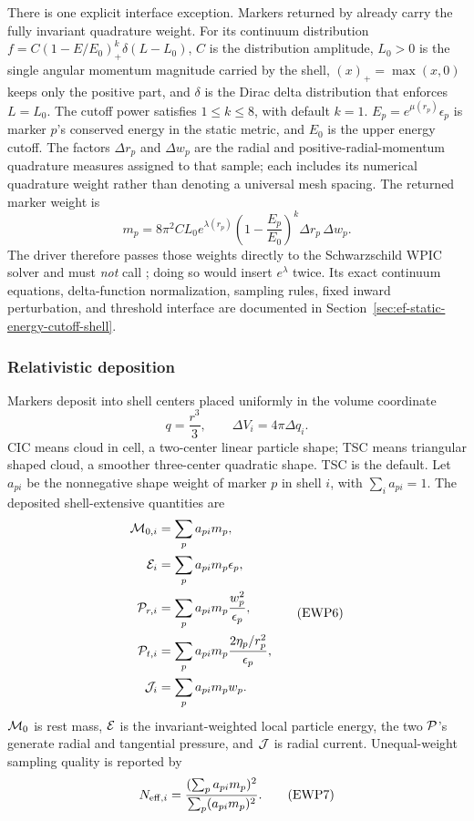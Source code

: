 There is one explicit interface exception.  Markers returned by
 already carry the
fully invariant quadrature weight.  For its continuum distribution
\(f=C(1-E/E_0)_+^k\delta(L-L_0)\), \(C\) is the distribution amplitude,
\(L_0>0\) is the single angular momentum magnitude carried by the shell,
\((x)_+=\max(x,0)\) keeps only the positive part, and \(\delta\) is the Dirac
delta distribution that enforces \(L=L_0\).
The cutoff power satisfies \(1\le k\le8\), with default \(k=1\).
\(E_p=e^{\mu(r_p)}\epsilon_p\) is marker \(p\)'s conserved energy in the
static metric, and \(E_0\) is the upper energy cutoff.  The factors
\(\Delta r_p\) and \(\Delta w_p\) are the radial and positive-radial-momentum
quadrature measures assigned to that sample; each includes its numerical
quadrature weight rather than denoting a universal mesh spacing.  The returned
marker weight is
\[
 m_p=8\pi^2 CL_0 e^{\lambda(r_p)}
      \left(1-\frac{E_p}{E_0}\right)^k
      \Delta r_p\,\Delta w_p .
\]
The  driver therefore passes those weights directly
to the Schwarzschild WPIC solver and must \emph{not} call
;
doing so would insert \(e^\lambda\) twice.  Its exact continuum equations,
delta-function normalization, sampling rules, fixed inward perturbation, and
threshold interface are documented in
Section~\ref{sec:ef-static-energy-cutoff-shell}.

\subsubsection{Relativistic deposition}

Markers deposit into shell centers placed uniformly in the volume coordinate
\[
 q=\frac{r^3}{3},\qquad \Delta V_i=4\pi\Delta q_i.       \tag{EWP5}
\]
CIC means cloud in cell, a two-center linear particle shape; TSC means
triangular shaped cloud, a smoother three-center quadratic shape.  TSC is the
default.  Let \(a_{pi}\) be the nonnegative shape weight of marker \(p\) in
shell \(i\), with \(\sum_i a_{pi}=1\).  The deposited shell-extensive
quantities are
\[
\begin{aligned}
 {\cal M}_{0,i}&=\sum_p a_{pi}m_p,\\
 {\cal E}_i&=\sum_p a_{pi}m_p\epsilon_p,\\
 {\cal P}_{r,i}&=\sum_p a_{pi}m_p\frac{w_p^2}{\epsilon_p},\\
 {\cal P}_{t,i}&=\sum_p a_{pi}m_p
                 \frac{2\eta_p/r_p^2}{\epsilon_p},\\
 {\cal J}_i&=\sum_p a_{pi}m_pw_p.
\end{aligned}                                           \tag{EWP6}
\]
\({\cal M}_0\) is rest mass, \({\cal E}\) is the invariant-weighted local
particle energy, the two
\({\cal P}\)'s generate radial and tangential pressure, and \({\cal J}\) is
radial current.  Unequal-weight sampling quality is reported by
\[
 N_{{\rm eff},i}
 =\frac{(\sum_p a_{pi}m_p)^2}{\sum_p(a_{pi}m_p)^2}.      \tag{EWP7}
\]

